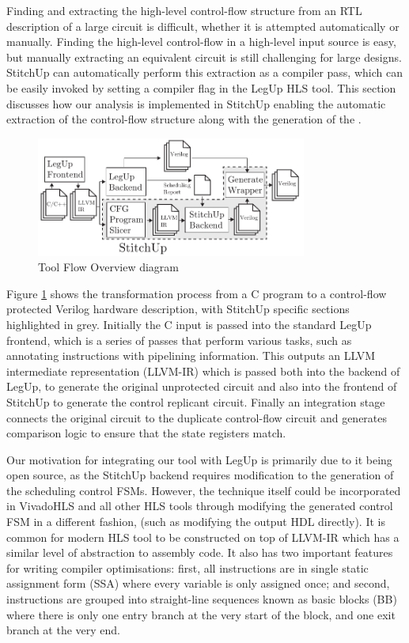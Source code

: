 Finding and extracting the high-level control-flow structure from an RTL description
of a large circuit is difficult, whether it is attempted automatically or manually.
Finding the high-level control-flow in a high-level input source is easy, but manually
extracting an equivalent circuit is still challenging for large designs.
StitchUp can automatically perform this extraction as a compiler pass, which can be
easily invoked by setting a compiler flag in the LegUp HLS tool.
This section discusses how our analysis is implemented in StitchUp enabling the automatic extraction of the
control-flow structure along with the generation of the .

\begin{figure}[t]
\centering
\includegraphics[width=3.5in]{./imgs/tool-flow.pdf}
\caption{Tool Flow Overview diagram}
\label{fig:tool_flow_diagram}
\end{figure}

Figure \ref{fig:tool_flow_diagram} shows the transformation process from a C program
to a control-flow protected
Verilog hardware description, with StitchUp specific sections highlighted in grey.
Initially the C input is passed into the standard LegUp frontend, which is
a series of passes that
perform various tasks, such as annotating instructions with pipelining information.
This outputs an LLVM intermediate representation (LLVM-IR) which is passed both into the backend of LegUp,
to generate the
original unprotected circuit and also into the frontend of StitchUp to generate the control replicant circuit.
Finally an integration stage connects the original circuit to the duplicate control-flow circuit
and generates comparison logic to ensure that the state registers match.

Our motivation for integrating our tool with LegUp is primarily due to it being open source, as
the StitchUp backend requires modification to the generation of the scheduling control FSMs.
However, the technique itself could be incorporated in VivadoHLS and all other HLS tools through modifying the
generated control FSM in a different fashion, (such as modifying the output HDL directly).
It is common for modern HLS tool to be constructed on top of LLVM-IR which has
a similar level of abstraction to assembly code.
It also has two important features for writing compiler optimisations:
first, all instructions are in single static assignment form (SSA) where every variable is only
assigned once; and second, instructions are grouped into straight-line sequences known as basic blocks (BB)
where there is only one entry branch at the very start of the block, and one exit branch at the very end.

